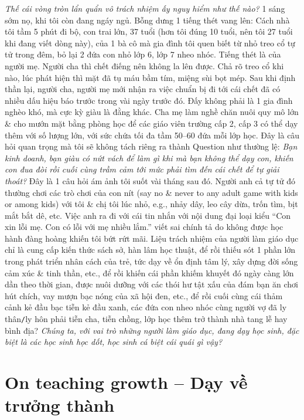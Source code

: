 \documentclass[12pt,twoside]{book}
\begin{document}
{\it Thế cái vòng tròn lẩn quẩn vô trách nhiệm ấy nguy hiểm như thế nào?} 1 sáng sớm nọ, khi tôi còn đang ngáy ngủ. Bỗng dưng 1 tiếng thét vang lên: Cách nhà tôi tầm 5 phút đi bộ, con trai lớn, 37 tuổi (hơn tôi đúng 10 tuổi, nên tôi 27 tuổi khi đang viết dòng này), của 1 bà cô mà gia đình tôi quen biết từ nhỏ treo cổ tự tử trong đêm, bỏ lại 2 đứa con nhỏ lớp 6, lớp 7 nheo nhóc. Tiếng thét là của người mẹ. Người cha thì chết điếng nên không la lên được. Chả rõ treo cổ khi nào, lúc phát hiện thì mặt đã tụ máu bầm tím, miệng sùi bọt mép. Sau khi định thần lại, người cha, người mẹ mới nhận ra việc chuẩn bị đi tới cái chết đã có nhiều dấu hiệu báo trước trong vài ngày trước đó. Đấy không phải là 1 gia đình nghèo khó, mà cực kỳ giàu là đằng khác. Cha mẹ làm nghề chăn nuôi quy mô lớn \& cho mướn mặt bằng phòng học để các giáo viên trường cấp 2, cấp 3 có thể dạy thêm với số lượng lớn, với sức chứa tối đa tầm 50--60 đứa mỗi lớp học. Đây là câu hỏi quan trọng mà tôi sẽ không tách riêng ra thành Question như thường lệ: {\it Bạn kinh doanh, bạn giàu có nứt vách để làm gì khi mà bạn không thể dạy con, khiến con đua đòi rồi cuối cùng trầm cảm tới mức phải tìm đến cái chết để tự giải thoát?} Đây là 1 câu hỏi ám ảnh tôi suốt vài tháng sau đó. Người anh cả tự tử đó thường chơi các trò chơi của con nít (say no \& never to any adult game with kids or among kids) với tôi \& chị tôi lúc nhỏ, e.g., nhảy dây, leo cây dừa, trốn tìm, bịt mắt bắt dê, etc. Việc anh ra đi với cái tin nhắn với nội dung đại loại kiểu ``Con xin lỗi mẹ. Con có lỗi với mẹ nhiều lắm.'' viết sai chính tả do không được học hành đàng hoàng khiến tôi bứt rứt mãi. Liệu trách nhiệm của người làm giáo dục chỉ là cung cấp kiến thức sách sở, hàn lâm học thuật, để rồi thiếu sót 1 phần lớn trong phát triển nhân cách của trẻ, tức dạy về ổn định tâm lý, xây dựng đời sống cảm xúc \& tinh thần, etc., để rồi khiến cái phần khiếm khuyết đó ngày càng lớn dần theo thời gian, được nuôi dưỡng với các thói hư tật xấu của đám bạn ăn chơi hút chích, vay mượn bạc nóng của xã hội đen, etc., để rồi cuối cùng cái thảm cảnh kẻ đầu bạc tiễn kẻ đầu xanh, các đứa con nheo nhóc cùng người vợ đã ly thân{\tt/}ly hôn phải tiễn cha, tiễn chồng, lớp học thêm trở thành nhà tang lễ hay bình địa? {\it Chúng ta, với vai trò những người làm giáo dục, đang dạy học sinh, đặc biệt là các học sinh học dốt, học sinh cá biệt cái quái gì vậy?}

\section{On teaching growth -- Dạy về trưởng thành}
\end{document}
